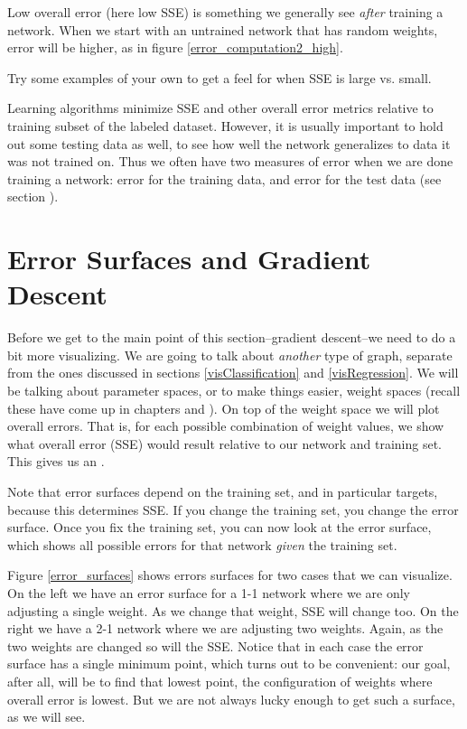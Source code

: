 Low overall error (here low SSE) is something we generally see \emph{after} training a  network. When we start with an untrained network that has random weights, error will be higher, as in figure \ref{error_computation2_high}.

Try some examples of your own to get a feel for when SSE is large vs. small.

Learning algorithms minimize SSE and other overall error metrics relative to training subset of the labeled dataset. However, it is usually important to hold out some testing data as well, to see how well the network generalizes to data it was not trained on. Thus we often have two measures of error when we are done training a network: error for the training data, and error for the test data (see section ).

\section{Error Surfaces and Gradient Descent}\label{sect_gradient_descent}

Before we get to the main point of this section--gradient descent--we need to do a bit more visualizing. We are going to talk about \emph{another} type of graph, separate from the ones discussed in sections \ref{visClassification} and \ref{visRegression}. We will be talking about parameter spaces, or to make things easier, weight spaces (recall these have come up in chapters  and ). On top of the weight space we will plot overall errors. That is, for each possible combination of weight values, we show what overall error (\eg SSE) would result relative to our network and training set. This  gives us an . 

Note that error surfaces depend on the training set, and in particular targets, because this determines SSE. If you change the training set, you change the error surface. Once you fix the training set, you can now look at the error surface, which shows all possible errors for that network \emph{given} the training set.

Figure \ref{error_surfaces} shows errors surfaces for two cases that we can visualize. On the left we have an error surface for a 1-1 network where we are only adjusting a single weight. As we change that weight, SSE will change too. On the right we have a 2-1 network where we are adjusting two weights. Again, as the two weights are changed so will the SSE. Notice that in each case the error surface has a single minimum point, which turns out to be convenient: our goal, after all, will be to find that lowest point, the configuration of weights where overall error is lowest.  But we are not always lucky enough to get such a surface, as we will see.

